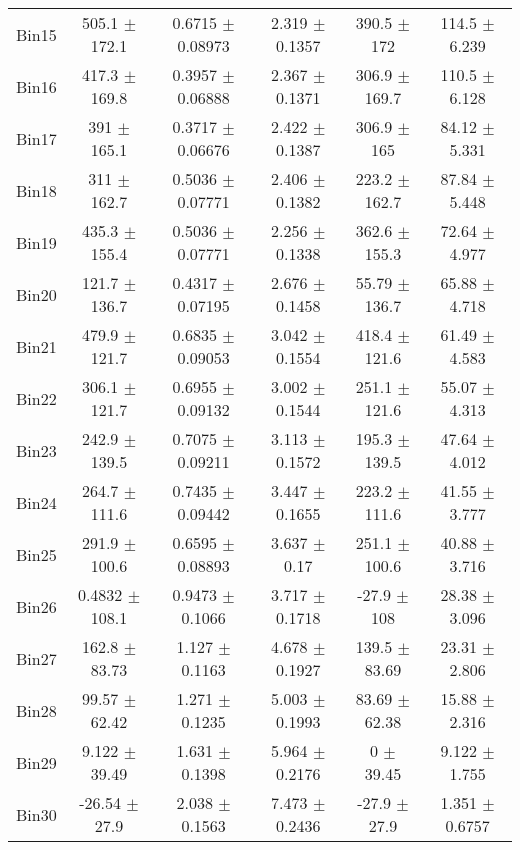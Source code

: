 \begin{tabular}{@{\extracolsep{4pt}}lccccc@{}}
     Bin15 & 505.1 $\pm$ 172.1 & 0.6715 $\pm$ 0.08973 & 2.319 $\pm$ 0.1357 & 390.5 $\pm$ 172 & 114.5 $\pm$ 6.239 \\ 
     Bin16 & 417.3 $\pm$ 169.8 & 0.3957 $\pm$ 0.06888 & 2.367 $\pm$ 0.1371 & 306.9 $\pm$ 169.7 & 110.5 $\pm$ 6.128 \\ 
     Bin17 & 391 $\pm$ 165.1 & 0.3717 $\pm$ 0.06676 & 2.422 $\pm$ 0.1387 & 306.9 $\pm$ 165 & 84.12 $\pm$ 5.331 \\ 
     Bin18 & 311 $\pm$ 162.7 & 0.5036 $\pm$ 0.07771 & 2.406 $\pm$ 0.1382 & 223.2 $\pm$ 162.7 & 87.84 $\pm$ 5.448 \\ 
     Bin19 & 435.3 $\pm$ 155.4 & 0.5036 $\pm$ 0.07771 & 2.256 $\pm$ 0.1338 & 362.6 $\pm$ 155.3 & 72.64 $\pm$ 4.977 \\ 
     Bin20 & 121.7 $\pm$ 136.7 & 0.4317 $\pm$ 0.07195 & 2.676 $\pm$ 0.1458 & 55.79 $\pm$ 136.7 & 65.88 $\pm$ 4.718 \\ 
     Bin21 & 479.9 $\pm$ 121.7 & 0.6835 $\pm$ 0.09053 & 3.042 $\pm$ 0.1554 & 418.4 $\pm$ 121.6 & 61.49 $\pm$ 4.583 \\ 
     Bin22 & 306.1 $\pm$ 121.7 & 0.6955 $\pm$ 0.09132 & 3.002 $\pm$ 0.1544 & 251.1 $\pm$ 121.6 & 55.07 $\pm$ 4.313 \\ 
     Bin23 & 242.9 $\pm$ 139.5 & 0.7075 $\pm$ 0.09211 & 3.113 $\pm$ 0.1572 & 195.3 $\pm$ 139.5 & 47.64 $\pm$ 4.012 \\ 
     Bin24 & 264.7 $\pm$ 111.6 & 0.7435 $\pm$ 0.09442 & 3.447 $\pm$ 0.1655 & 223.2 $\pm$ 111.6 & 41.55 $\pm$ 3.777 \\ 
     Bin25 & 291.9 $\pm$ 100.6 & 0.6595 $\pm$ 0.08893 & 3.637 $\pm$ 0.17 & 251.1 $\pm$ 100.6 & 40.88 $\pm$ 3.716 \\ 
     Bin26 & 0.4832 $\pm$ 108.1 & 0.9473 $\pm$ 0.1066 & 3.717 $\pm$ 0.1718 & -27.9 $\pm$ 108 & 28.38 $\pm$ 3.096 \\ 
     Bin27 & 162.8 $\pm$ 83.73 & 1.127 $\pm$ 0.1163 & 4.678 $\pm$ 0.1927 & 139.5 $\pm$ 83.69 & 23.31 $\pm$ 2.806 \\ 
     Bin28 & 99.57 $\pm$ 62.42 & 1.271 $\pm$ 0.1235 & 5.003 $\pm$ 0.1993 & 83.69 $\pm$ 62.38 & 15.88 $\pm$ 2.316 \\ 
     Bin29 & 9.122 $\pm$ 39.49 & 1.631 $\pm$ 0.1398 & 5.964 $\pm$ 0.2176 & 0 $\pm$ 39.45 & 9.122 $\pm$ 1.755 \\ 
     Bin30 & -26.54 $\pm$ 27.9 & 2.038 $\pm$ 0.1563 & 7.473 $\pm$ 0.2436 & -27.9 $\pm$ 27.9 & 1.351 $\pm$ 0.6757 \\ 
\hline\hline
  \end{tabular}
